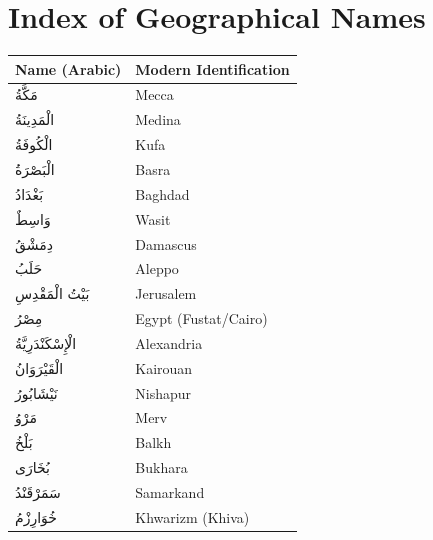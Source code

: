 \documentclass[11pt,a4paper]{article}
\newcommand{\ar}[1]{\arabicfont\beginR #1\endR}
\begin{document}

\section*{Index of Geographical Names}

\begin{center}
\begin{longtable}{ll}
\toprule
\textbf{Name (Arabic)} & \textbf{Modern Identification} \\
\midrule
\endhead
\ar{مَكَّةُ} & Mecca \\
\ar{الْمَدِينَةُ} & Medina \\
\ar{الْكُوفَةُ} & Kufa \\
\ar{الْبَصْرَةُ} & Basra \\
\ar{بَغْدَادُ} & Baghdad \\
\ar{وَاسِطٌ} & Wasit \\
\ar{دِمَشْقُ} & Damascus \\
\ar{حَلَبُ} & Aleppo \\
\ar{بَيْتُ الْمَقْدِسِ} & Jerusalem \\
\ar{مِصْرُ} & Egypt (Fustat/Cairo) \\
\ar{الْإِسْكَنْدَرِيَّةُ} & Alexandria \\
\ar{الْقَيْرَوَانُ} & Kairouan \\
\ar{نَيْشَابُورُ} & Nishapur \\
\ar{مَرْوُ} & Merv \\
\ar{بَلْخُ} & Balkh \\
\ar{بُخَارَى} & Bukhara \\
\ar{سَمَرْقَنْدُ} & Samarkand \\
\ar{خُوَارِزْمُ} & Khwarizm (Khiva) \\
\bottomrule
\end{longtable}
\end{center}
\end{document}
